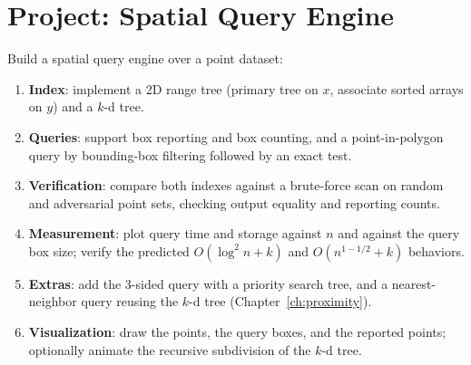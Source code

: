 \section{Project: Spatial Query Engine}
\label{sec:rangesearch_project}

Build a spatial query engine over a point dataset:
\begin{enumerate}
  \item \textbf{Index}: implement a 2D range tree (primary tree on $x$,
    associate sorted arrays on $y$) and a $k$-d tree.
  \item \textbf{Queries}: support box reporting and box counting, and a
    point-in-polygon query by bounding-box filtering followed by an exact
    test.
  \item \textbf{Verification}: compare both indexes against a brute-force
    scan on random and adversarial point sets, checking output equality and
    reporting counts.
  \item \textbf{Measurement}: plot query time and storage against $n$ and
    against the query box size; verify the predicted $O(\log^2 n + k)$ and
    $O(n^{1-1/2} + k)$ behaviors.
  \item \textbf{Extras}: add the 3-sided query with a priority search
    tree, and a nearest-neighbor query reusing the $k$-d tree
    (Chapter~\ref{ch:proximity}).
  \item \textbf{Visualization}: draw the points, the query boxes, and the
    reported points; optionally animate the recursive subdivision of the
    $k$-d tree.
\end{enumerate}
